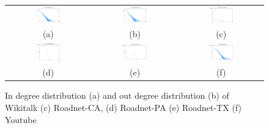 \begin{figure}[h!]
\begin{center}
\begin{tabular}{c c c}
     \includegraphics[width=0.3\textwidth]{FIG/t1_wiki_in.png} &
     \includegraphics[width=0.3\textwidth]{FIG/t1_wiki_out.png} & 
     \includegraphics[width=0.3\textwidth]{FIG/t1_ca.png}\\
    (a) & (b) & (c) \\
     \includegraphics[width=0.3\textwidth]{FIG/t1_pa.png} & 
     \includegraphics[width=0.3\textwidth]{FIG/t1_tx.png} & 
     \includegraphics[width=0.3\textwidth]{FIG/t1_youtube.png} \\
     (d) & (e) & (f) \\
\end{tabular}
\caption{In degree distribution (a) and out degree distribution (b) of Wikitalk (c) Roadnet-CA, (d) Roadnet-PA (e) Roadnet-TX (f) Youtube}
\label{t1:plot}
\end{center}
\end{figure}

